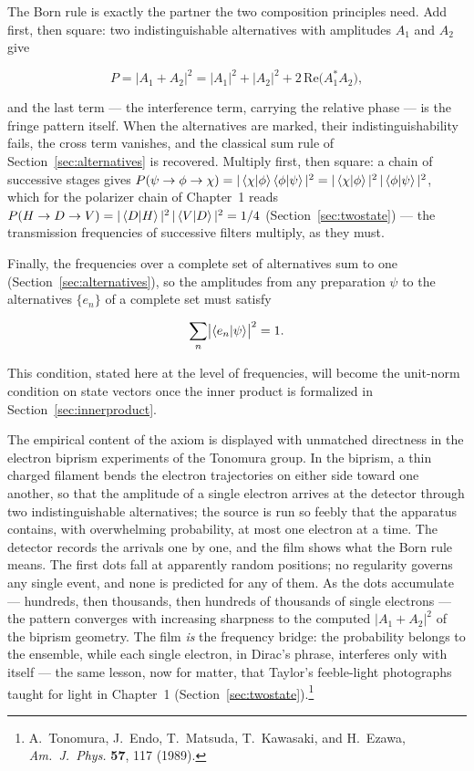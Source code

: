 The Born rule is exactly the partner the two composition principles need. Add first, then square: two indistinguishable alternatives with amplitudes $A_1$ and $A_2$ give
\begin{linenomath}
\begin{equation}
    P = |A_1 + A_2|^2 = |A_1|^2 + |A_2|^2 + 2\,\mathrm{Re}\bigl(A_1^{*}A_2\bigr) ,
\end{equation}
\end{linenomath}
and the last term --- the interference term, carrying the relative phase --- is the fringe pattern itself. When the alternatives are marked, their indistinguishability fails, the cross term vanishes, and the classical sum rule of Section~\ref{sec:alternatives} is recovered. Multiply first, then square: a chain of successive stages gives $P(\psi \to \phi \to \chi) = |\braket{\chi|\phi}\braket{\phi|\psi}|^2 = |\braket{\chi|\phi}|^2\,|\braket{\phi|\psi}|^2$, which for the polarizer chain of Chapter~1 reads $P(H \to D \to V) = |\braket{D|H}|^2\,|\braket{V|D}|^2 = 1/4$ (Section~\ref{sec:twostate}) --- the transmission frequencies of successive filters multiply, as they must.

Finally, the frequencies over a complete set of alternatives sum to one (Section~\ref{sec:alternatives}), so the amplitudes from any preparation $\psi$ to the alternatives $\{e_n\}$ of a complete set must satisfy
\begin{linenomath}
\begin{equation}
    \sum_n \bigl|\braket{e_n|\psi}\bigr|^2 = 1 .
\end{equation}
\end{linenomath}
This condition, stated here at the level of frequencies, will become the unit-norm condition on state vectors once the inner product is formalized in Section~\ref{sec:innerproduct}.

The empirical content of the axiom is displayed with unmatched directness in the electron biprism experiments of the Tonomura group. In the biprism, a thin charged filament bends the electron trajectories on either side toward one another, so that the amplitude of a single electron arrives at the detector through two indistinguishable alternatives; the source is run so feebly that the apparatus contains, with overwhelming probability, at most one electron at a time. The detector records the arrivals one by one, and the film shows what the Born rule means. The first dots fall at apparently random positions; no regularity governs any single event, and none is predicted for any of them. As the dots accumulate --- hundreds, then thousands, then hundreds of thousands of single electrons --- the pattern converges with increasing sharpness to the computed $|A_1 + A_2|^2$ of the biprism geometry. The film \emph{is} the frequency bridge: the probability belongs to the ensemble, while each single electron, in Dirac's phrase, interferes only with itself --- the same lesson, now for matter, that Taylor's feeble-light photographs taught for light in Chapter~1 (Section~\ref{sec:twostate}).\footnote{A.~Tonomura, J.~Endo, T.~Matsuda, T.~Kawasaki, and H.~Ezawa, \emph{Am.~J.~Phys.} \textbf{57}, 117 (1989).}

